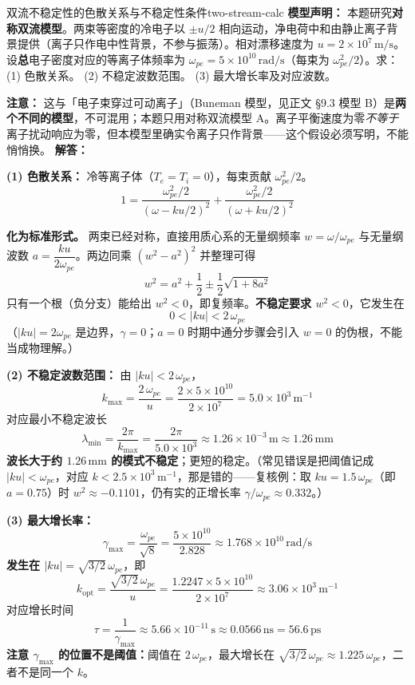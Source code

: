 \begin{example}{双流不稳定性的色散关系与不稳定性条件}{two-stream-calc}
\textbf{模型声明：} 本题研究\textbf{对称双流模型}。两束等密度的冷电子以 $\pm u/2$ 相向运动，净电荷中和由静止离子背景提供（离子只作电中性背景，不参与振荡）。相对漂移速度为 $u = 2\times 10^{7}\,\mathrm{m/s}$。设\textbf{总}电子密度对应的等离子体频率为 $\omega_{pe} = 5\times 10^{10}\,\mathrm{rad/s}$（每束为 $\omega_{pe}^2/2$）。求：(1) 色散关系。
(2) 不稳定波数范围。
(3) 最大增长率及对应波数。

\textbf{注意：} 这与「电子束穿过可动离子」（Buneman 模型，见正文 \S 9.3 模型 B）是\textbf{两个不同的模型}，不可混用；本题只用对称双流模型 A。离子平衡速度为零\emph{不等于}离子扰动响应为零，但本模型里确实令离子只作背景——这个假设必须写明，不能悄悄换。
\tcblower
\textbf{解答：}

\textbf{(1) 色散关系：} 冷等离子体（$T_e=T_i=0$），每束贡献 $\omega_{pe}^2/2$。
\[
1=\frac{\omega_{pe}^2/2}{(\omega-ku/2)^2}+\frac{\omega_{pe}^2/2}{(\omega+ku/2)^2}
\]

\textbf{化为标准形式。} 两束已经对称，直接用质心系的无量纲频率 $w=\omega/\omega_{pe}$ 与无量纲波数 $a=\dfrac{ku}{2\omega_{pe}}$。两边同乘 $(w^2-a^2)^2$ 并整理可得
\[
w^2=a^2+\frac12\pm\frac12\sqrt{1+8a^2}
\]
只有一个根（负分支）能给出 $w^2<0$，即复频率。\textbf{不稳定要求 $w^2<0$}，它发生在
\[
0<|ku|<2\,\omega_{pe}
\]
（$|ku|=2\omega_{pe}$ 是边界，$\gamma=0$；$a=0$ 时期中通分步骤会引入 $w=0$ 的伪根，不能当成物理解。）

\textbf{(2) 不稳定波数范围：} 由 $|ku|<2\,\omega_{pe}$，
\[
k_{\max}=\frac{2\,\omega_{pe}}{u}=\frac{2\times 5\times10^{10}}{2\times10^{7}}
= 5.0\times 10^{3}\,\mathrm{m}^{-1}
\]
对应最小不稳定波长
\[
\lambda_{\min}=\frac{2\pi}{k_{\max}}=\frac{2\pi}{5.0\times10^{3}}\approx 1.26\times 10^{-3}\,\mathrm{m}\approx 1.26\,\mathrm{mm}
\]
\textbf{波长大于约 $1.26\,\mathrm{mm}$ 的模式不稳定}；更短的稳定。（常见错误是把阈值记成 $|ku|<\omega_{pe}$，对应 $k<2.5\times10^3\,\mathrm{m^{-1}}$，那是错的——复核例：取 $ku=1.5\,\omega_{pe}$（即 $a=0.75$）时 $w^2\approx-0.1101$，仍有实的正增长率 $\gamma/\omega_{pe}\approx0.332$。）

\textbf{(3) 最大增长率：}
\[
\gamma_{\max}=\frac{\omega_{pe}}{\sqrt8}=\frac{5\times 10^{10}}{2.828}\approx 1.768\times 10^{10}\,\mathrm{rad/s}
\]
\textbf{发生在 $|ku|=\sqrt{3/2}\,\omega_{pe}$}，即
\[
k_{\text{opt}}=\frac{\sqrt{3/2}\,\omega_{pe}}{u}=\frac{1.2247\times5\times10^{10}}{2\times10^{7}}\approx 3.06\times10^{3}\,\mathrm{m}^{-1}
\]
对应增长时间
\[
\tau=\frac{1}{\gamma_{\max}}\approx 5.66\times 10^{-11}\,\mathrm{s}\approx 0.0566\,\mathrm{ns}=56.6\,\mathrm{ps}
\]
\textbf{注意 $\gamma_{\max}$ 的位置不是阈值：}阈值在 $2\,\omega_{pe}$，最大增长在 $\sqrt{3/2}\,\omega_{pe}\approx1.225\,\omega_{pe}$，二者不是同一个 $k$。


\end{example}

